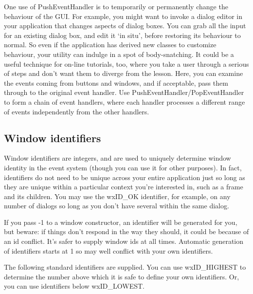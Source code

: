 One use of PushEventHandler is to temporarily or permanently change the
behaviour of the GUI. For example, you might want to invoke a dialog editor
in your application that changes aspects of dialog boxes. You can
grab all the input for an existing dialog box, and edit it `in situ',
before restoring its behaviour to normal. So even if the application
has derived new classes to customize behaviour, your utility can indulge
in a spot of body-snatching. It could be a useful technique for on-line
tutorials, too, where you take a user through a serious of steps and
don't want them to diverge from the lesson. Here, you can examine the events
coming from buttons and windows, and if acceptable, pass them through to
the original event handler. Use PushEventHandler/PopEventHandler
to form a chain of event handlers, where each handler processes a different
range of events independently from the other handlers.

\subsection{Window identifiers}\label{windowids}

Window identifiers are integers, and are used to uniquely determine window identity in the
event system (though you can use it for other purposes). In fact, identifiers do not need
to be unique across your entire application just so long as they are unique within a particular context you're interested
in, such as a frame and its children. You may use the wxID\_OK identifier, for example, on
any number of dialogs so long as you don't have several within the same dialog.

If you pass -1 to a window constructor, an identifier will be generated for you, but beware:
if things don't respond in the way they should, it could be because of an id conflict. It's safer
to supply window ids at all times. Automatic generation of identifiers starts at 1 so may well conflict
with your own identifiers.

The following standard identifiers are supplied. You can use wxID\_HIGHEST to determine the
number above which it is safe to define your own identifiers. Or, you can use identifiers below
wxID\_LOWEST.

